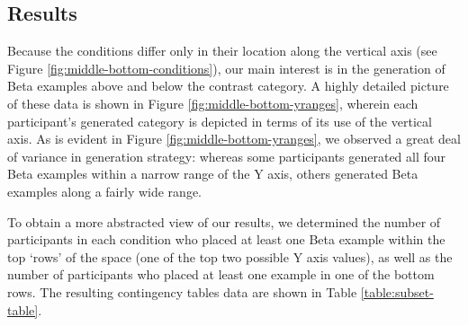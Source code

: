 \documentclass[10pt,letterpaper]{article}
\begin{document}


\subsection{Results}

Because the conditions differ only in their location along the vertical axis (see Figure \ref{fig:middle-bottom-conditions}), our main interest is in the generation of Beta examples above and below the contrast category. A highly detailed picture of these data is shown in Figure \ref{fig:middle-bottom-yranges}, wherein each participant's generated category is depicted in terms of its use of the vertical axis. As is evident in Figure \ref{fig:middle-bottom-yranges}, we observed a great deal of variance in generation strategy: whereas some participants generated all four Beta examples within a narrow range of the Y axis, others generated Beta examples along a fairly wide range. 

\begin{figure*}
    \begin{center}
    
    \caption{Behavioral results. Each line shows the minimum and maximum value of a generated category along the Y (vertical) axis. Dots along each line represent the positions of individual exemplars in the category, and each participant's category is shown on a separate line. Participants are sorted by overall Y axis range, and then by condition.}
    \label{fig:middle-bottom-yranges}
    \end{center}
\end{figure*}

To obtain a more abstracted view of our results, we determined the number of participants in each condition who placed at least one Beta example within the top `rows' of the space (one of the top two possible Y axis values), as well as the number of participants who placed at least one example in one of the bottom rows. The resulting contingency tables data are shown in Table \ref{table:subset-table}.
\end{document}
